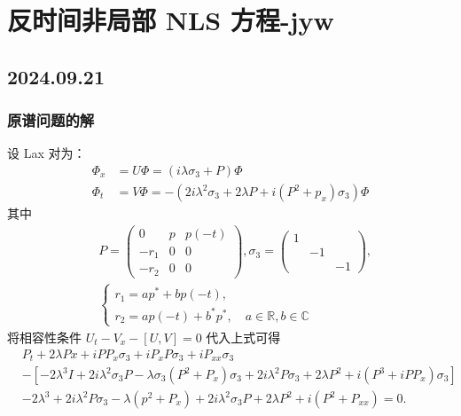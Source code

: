 \chapter{反时间非局部 NLS 方程-jyw}

\section{2024.09.21}

\subsection{原谱问题的解}
设 Lax 对为：
\begin{equation}
    \begin{aligned}
        \Phi_{x} &= U \Phi = (i \lambda \sigma_{3} + P) \Phi \\
        \Phi_{t} &= V \Phi = -(2i\lambda^{2} \sigma_{3} + 2 \lambda P + i (P^{2} + p_{x})\sigma_{3}) \Phi
    \end{aligned}
\end{equation}
其中
\begin{equation}
    \begin{aligned}
        &
        P = \begin{pmatrix}
            0 & p & p(-t) \\ -r_{1} & 0 & 0 \\ -r_{2} & 0 & 0
        \end{pmatrix}, 
        \sigma_{3} = \begin{pmatrix}
            1 &  & \\ & -1 & \\ & & -1 
        \end{pmatrix}, \\
    & \begin{cases}
        r_{1} = ap^{*} + b p(-t),\\
        r_{2} = ap(-t) + b^{*}p^{*}, \quad a \in \mathbb{R}, b \in \mathbb{C}
    \end{cases}
\end{aligned}
\end{equation}
将相容性条件 $ U_{t} - V_{x} - [U,V] = 0 $ 代入上式可得
\begin{equation}
    \begin{aligned}
        &P_{t} + 2\lambda P{x} + iPP_{x}\sigma_{3} + iP_{x} P\sigma_{3} + iP_{xx}\sigma_{3} \\
        &-[-2 \lambda^{3}I + 2i \lambda^{2} \sigma_{3} P - \lambda \sigma_{3} (P^{2} + P_{x}) \sigma_{3} + 2i \lambda^{2} P \sigma_{3} + 2 \lambda P^{2} + i (P^{3} + iPP_{x})\sigma_{3} ] \\
        &-2 \lambda^3 + 2i \lambda^2 P \sigma_{3} - \lambda (p^{2} + P_{x}) + 2i \lambda^{2} \sigma_{3} P + 2 \lambda P^{2} + i (P^{2} + P_{xx}) = 0.
    \end{aligned}
\end{equation}
